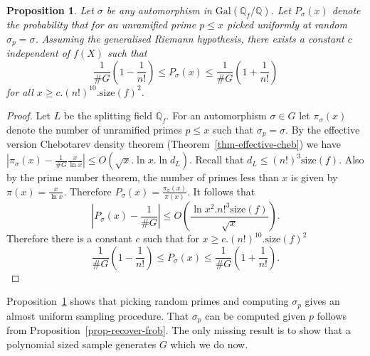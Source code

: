 \documentclass[11pt]{madras}%
\newtheorem{proposition}[theorem]{Proposition}
\theoremstyle{remark}
\newcommand{\Gal}[1]{{\ensuremath{\mathrm{Gal}\left(#1\right)}}}
\newcommand{\size}[1]{{\ensuremath{\mathrm{size}\left(#1\right)}}}
\begin{document}
\begin{proposition}\label{prop-sampler-probability}
  Let $\sigma$ be any automorphism in $\Gal{\mathbb{Q}_f/\mathbb{Q}}$.
  Let $P_\sigma(x)$ denote the probability that for an unramified
  prime $p \leq x$ picked uniformly at random $\sigma_p = \sigma$.
  Assuming the generalised Riemann hypothesis, there exists a constant
  $c$ independent of $f(X)$ such that
  \[ \frac{1}{\#G} \left(1 - \frac{1}{n!}\right) \leq P_\sigma(x) \leq
  \frac{1}{\#G} \left(1 + \frac{1}{n!}\right) \] for all $x \geq c .
  (n!)^{10}. \size{f}^2$.
\end{proposition}
\begin{proof}
  Let $L$ be the splitting field $\mathbb{Q}_f$. For an automorphism
  $\sigma \in G$ let $\pi_\sigma(x)$ denote the number of unramified
  primes $p \leq x$ such that $\sigma_p = \sigma$.  By the effective
  version Chebotarev density theorem
  (Theorem~\ref{thm-effective-cheb}) we have $\left| \pi_\sigma(x) -
    \frac{1}{\# G} \frac{x}{\ln x} \right| \leq O(\sqrt{x} .\ln x .
  \ln{d_L})$. Recall that $d_L \leq (n!)^3 \size{f}$.  Also by the
  prime number theorem, the number of primes less than $x$ is given by
  $\pi(x) = \frac{x}{\ln{x}}$. Therefore $P_\sigma(x) =
  \frac{\pi_\sigma(x)}{\pi(x)}$. It follows that
  \[
  \left| P_\sigma(x) - \frac{1}{\# G} \right| \leq O\left(
    \frac{\ln{x}^2.{n!}^3 \size{f}}{\sqrt{x}}\right).
  \]
  Therefore there is a constant $c$ such that for $x \geq c .
  (n!)^{10} .\size{f}^2$
  \[
  \frac{1}{\#G}\left(1 - \frac{1}{n!}\right) \leq P_\sigma(x) \leq
  \frac{1}{\#G}\left(1 + \frac{1}{n!}\right).
  \]
\end{proof}


Proposition~\ref{prop-sampler-probability} shows that picking random
primes and computing $\sigma_p$ gives an almost uniform sampling
procedure. That $\sigma_p$ can be computed given $p$ follows from
Proposition~\ref{prop-recover-frob}. The only missing result is to
show that a polynomial sized sample generates $G$ which we do now.
\end{document}
